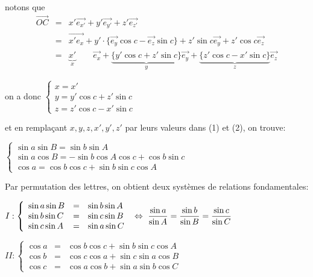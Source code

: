 \documentclass[12pt]{report}
\begin{document}
notons que 
\begin{eqnarray*}
\vec {OC} &=& x' \vec{e_{x'}} + y' \vec{e_{y'}} + z' \vec{e_{z'}}\\
&=& \vec{x'e_x} + y' \cdot \{\vec{e_y} \cos c - \vec{e_z} \sin c \} + z' \sin c \vec{e_y} + z' \cos c \vec{e_z} \\
&=& \underbrace{x'}_x \qquad \vec{e_x} + \underbrace{\{y' \cos c + z' \sin c\}}_y \vec{e_y} + \underbrace{\{z' \cos c - x' \sin c\}}_z \vec {e_z}
\end{eqnarray*}


on a donc $\left\{\begin{array}{lll} x=x'\\ y = y' \cos c + z' \sin c \\
z = z' \cos c - x' \sin c \end{array}\right.$ 
\bigskip

et en remplaçant $x,y,z,x',y',z'$ par leurs valeurs dans (1) et (2), on trouve:

\bigskip

$\left\{\begin{array}{lll}
\sin a \sin B = \sin b \sin A \\
\sin a \cos B = -\sin b \cos A \cos c + \cos b \sin c \\
\cos a = \cos b \cos c + \sin b \sin c \cos A
\end{array}
\right.
$

\bigskip\bigskip

Par permutation des lettres, on obtient deux systèmes de relations fondamentales:

\bigskip


\bigskip

$I: \left\{ \begin{array}{lll} 
\sin a \sin B &=&   \sin b \sin A \\
\sin b \sin C &=&  \sin c \sin   B \\
\sin c \sin A &=& \sin a \sin C  \end{array} \right. \  \displaystyle \Leftrightarrow \ {\sin a \over \sin A} = {\sin b \over \sin B} = {\sin c \over \sin C}
$

\bigskip

$II: \left\{ \begin{array}{lll} 
\cos a &=& \cos b \cos c + \sin b \sin c \cos A \\
\cos b &=& \cos c \cos a + \sin c \sin a \cos B \\
\cos c &=& \cos a \cos b + \sin a \sin b \cos C  \end{array} \right.
$
\end{document}
